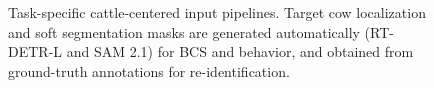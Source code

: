 \begin{figure}[htbp]
{%
}
\caption[Task-specific cattle-centered input pipelines]{Task-specific cattle-centered input pipelines. Target cow localization and soft segmentation masks are generated automatically (RT-DETR-L and SAM 2.1) for BCS and behavior, and obtained from ground-truth annotations for re-identification.}
\label{fig:task_representation_pipeline}
\end{figure}
